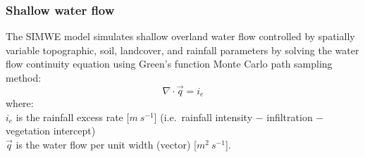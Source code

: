 \documentclass[gmd, manuscript]{copernicus}
\begin{document}

\subsubsection{Shallow water flow}

The SIMWE model simulates shallow overland water flow
controlled by spatially variable topographic, soil, landcover, 
and rainfall parameters by solving the water flow continuity equation 
using Green's function Monte Carlo path sampling method:
\begin{equation}
\label{eq:water}
\nabla \cdot \vec{q} = i_e
\end{equation}
{\small
\noindent
where: \\
\noindent
\hspace*{0.5em} $i_e$ is the rainfall excess rate [$\unit{m~s^{-1}}$]
(i.e.~rainfall intensity $-$ infiltration $-$ vegetation intercept)\\
\hspace*{0.5em} $\vec{q}$ is the water flow per unit width (vector) [$\unit{m}^2~\unit{s}^{-1}$]. 
}
\end{document}
